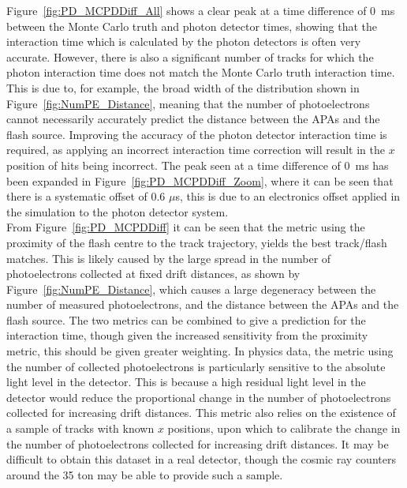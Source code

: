 Figure~\ref{fig:PD_MCPDDiff_All} shows a clear peak at a time difference of 0~ms between the Monte Carlo truth and photon detector times, showing that the interaction time which is calculated by the photon detectors is often very accurate. However, there is also a significant number of tracks for which the photon interaction time does not match the Monte Carlo truth interaction time. This is due to, for example, the broad width of the distribution shown in Figure~\ref{fig:NumPE_Distance}, meaning that the number of photoelectrons cannot necessarily accurately predict the distance between the APAs and the flash source. Improving the accuracy of the photon detector interaction time is required, as applying an incorrect interaction time correction will result in the $x$ position of hits being incorrect. The peak seen at a time difference of 0~ms has been expanded in Figure~\ref{fig:PD_MCPDDiff_Zoom}, where it can be seen that there is a systematic offset of 0.6 $\mu$s, this is due to an electronics offset applied in the simulation to the photon detector system. \\

From Figure~\ref{fig:PD_MCPDDiff} it can be seen that the metric using the proximity of the flash centre to the track trajectory, yields the best track/flash matches. This is likely caused by the large spread in the number of photoelectrons collected at fixed drift distances, as shown by Figure~\ref{fig:NumPE_Distance}, which causes a large degeneracy between the number of measured photoelectrons, and the distance between the APAs and the flash source. The two metrics can be combined to give a prediction for the interaction time, though given the increased sensitivity from the proximity metric, this should be given greater weighting. In physics data, the metric using the number of collected photoelectrons is particularly sensitive to the absolute light level in the detector. This is because a high residual light level in the detector would reduce the proportional change in the number of photoelectrons collected for increasing drift distances. This metric also relies on the existence of a sample of tracks with known $x$ positions, upon which to calibrate the change in the number of photoelectrons collected for increasing drift distances. It may be difficult to obtain this dataset in a real detector, though the cosmic ray counters around the 35 ton may be able to provide such a sample. \\

